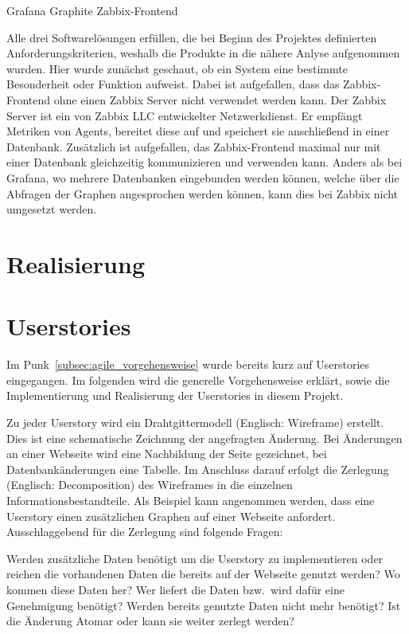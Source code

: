 \begin{outline}
  \1 Grafana
  \1 Graphite
  \2 Zabbix-Frontend
\end{outline}

Alle drei Softwarelösungen erfüllen, die bei Beginn des Projektes definierten
Anforderungskriterien, weshalb die Produkte in die nähere Anlyse aufgenommen
wurden. Hier wurde zunächst geschaut, ob ein System eine bestimmte Besonderheit
oder Funktion aufweist. Dabei ist aufgefallen, dass das Zabbix-Frontend ohne
einen Zabbix Server nicht verwendet werden kann. Der Zabbix Server ist ein von
Zabbix LLC entwickelter Netzwerkdienst. Er empfängt Metriken von Agents,
bereitet diese auf und speichert sie anschließend in einer Datenbank.
Zusätzlich ist aufgefallen, das Zabbix-Frontend maximal nur mit einer Datenbank
gleichzeitig kommunizieren und verwenden kann. Anders als bei Grafana, wo
mehrere Datenbanken eingebunden werden können, welche über die Abfragen der
Graphen angesprochen werden können, kann dies bei Zabbix nicht umgesetzt
werden.
\mr%

\section{Realisierung}

\section{Userstories}
Im Punk~\ref{subsec:agile_vorgehensweise} wurde bereits kurz auf Userstories
eingegangen. Im folgenden wird die generelle Vorgehensweise erklärt, sowie die
Implementierung und Realisierung der Userstories in diesem Projekt.

Zu jeder Userstory wird ein Drahtgittermodell (Englisch: Wireframe) erstellt.
Dies ist eine schematische Zeichnung der angefragten Änderung. Bei Änderungen
an einer Webseite wird eine Nachbildung der Seite gezeichnet, bei
Datenbankänderungen eine Tabelle. Im Anschluss darauf erfolgt die Zerlegung
(Englisch: Decomposition) des Wireframes in die einzelnen
Informationsbestandteile. Als Beispiel kann angenommen werden, dass eine
Userstory einen zusätzlichen Graphen auf einer Webseite anfordert.
Ausschlaggebend für die Zerlegung sind folgende Fragen:

\begin{outline}
  \1 Werden zusätzliche Daten benötigt um die Userstory zu implementieren oder
  reichen die vorhandenen Daten die bereits auf der Webseite genutzt werden?
  \1 Wo kommen diese Daten her?
  \1 Wer liefert die Daten bzw.\ wird dafür eine Genehmigung benötigt?
  \1 Werden bereits genutzte Daten nicht mehr benötigt?
  \1 Ist die Änderung Atomar oder kann sie weiter zerlegt werden?
\end{outline}

